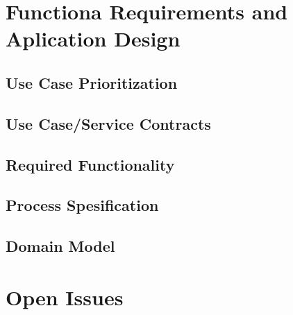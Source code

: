 \documentclass[12pt]{article}
\begin{document}
\section{Functiona Requirements and Aplication Design}

\subsection{Use Case Prioritization}

\subsection{Use Case/Service Contracts}

\subsection{Required Functionality}

\subsection{Process Spesification}

\subsection{Domain Model}


\section{Open Issues}
\end{document}
